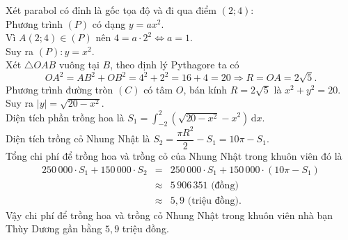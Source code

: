 \begin{bt}
{\begin{center}
		\end{center}
		Xét parabol có đỉnh là gốc tọa độ  và đi qua điểm $(2;4)$:\\
		Phương trình $(P)$ có  dạng $y=ax^2$.\\
		Vì $A(2;4) \in(P)$ nên $4=a\cdot 2^2\Leftrightarrow  a=1$.\\
		Suy ra  $(P)\colon y=x^2$.\\
		Xét $\triangle OAB$ vuông tại $B$, theo định  lý Pythagore ta có
		\[OA^2=AB^2+OB^2=4^2+2^2=16+4=20\Rightarrow  R=OA=2\sqrt 5.\]
		 Phương trình đường tròn $(C)$ có tâm $O$, bán kính $R=2\sqrt 5$ là $x^2+y^2=20$.\\
		 Suy ra $|y|=\sqrt{20-x^2}$.\\
		Diện  tích phần trồng hoa là $S_1=\displaystyle\int_{-2}^2\left(\sqrt{20-x^2}-x^2\right)\mathrm{\,d}x$.\\
		Diện tích trồng cỏ  Nhung Nhật là $S_2=\dfrac{\pi R^2}{2}-S_1=10\pi-S_1$.\\
		Tổng chi phí để trồng hoa và trồng cỏ của Nhung Nhật  trong khuôn viên đó là
		\allowdisplaybreaks 
		\begin{eqnarray*}
			250\,000\cdot S_1+150\,000\cdot  S_2&=&250\,000\cdot S_1+150\,000 \cdot\left(10 \pi-S_1\right)\\
			&\approx&5\,906\,351\text{ (đồng)}\\ 
			&\approx&5{,}9\text{  (triệu đồng).}
		\end{eqnarray*}
		Vậy chi phí để trồng hoa và trồng cỏ Nhung Nhật trong khuôn viên nhà bạn  Thùy Dương gần bằng $5{,}9$ triệu đồng.
	} 
\end{bt}

